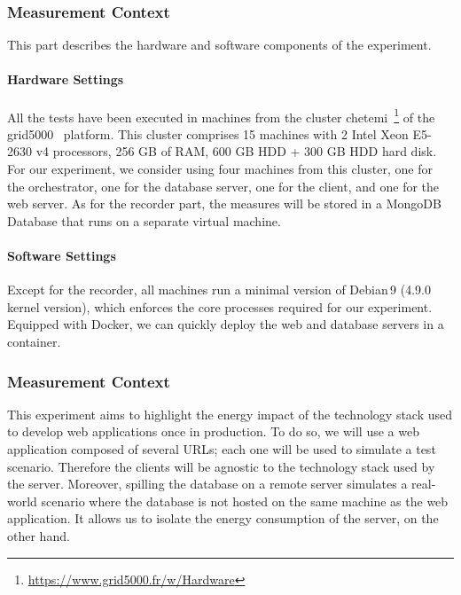 
\subsubsection*{Measurement Context}
This part describes the hardware and software components of the experiment.
\paragraph*{Hardware Settings}

All the tests have been executed in machines from the cluster \textsf{chetemi}~\footnote{\url{https://www.grid5000.fr/w/Hardware}} of the grid5000~\cite{cappello2010grid5000} platform.
This cluster comprises 15 machines with 2 Intel Xeon E5-2630 v4 processors, 256 GB of RAM,  600 GB HDD + 300 GB HDD hard disk.
For our experiment, we consider using four machines from this cluster, one for the orchestrator, one for the database server, one for the client, and one for the web server. As for the recorder part, the measures will be stored in a MongoDB Database that runs on a separate virtual machine.
\paragraph*{Software Settings}
Except for the recorder, all machines run a minimal version of Debian\,9 (4.9.0 kernel version), which enforces the core processes required for our experiment. Equipped with Docker, we can quickly deploy the web and database servers in a container.
\subsubsection{Measurement Context}
This experiment aims to highlight the energy impact of the technology stack used to develop web applications once in production.
To do so, we will use a web application composed of several URLs; each one will be used to simulate a test scenario. Therefore the clients will be agnostic to the technology stack used by the server.
Moreover, spilling the database on a remote server simulates a real-world scenario where the database is not hosted on the same machine as the web application. It allows us to isolate the energy consumption of the server, on the other hand.

